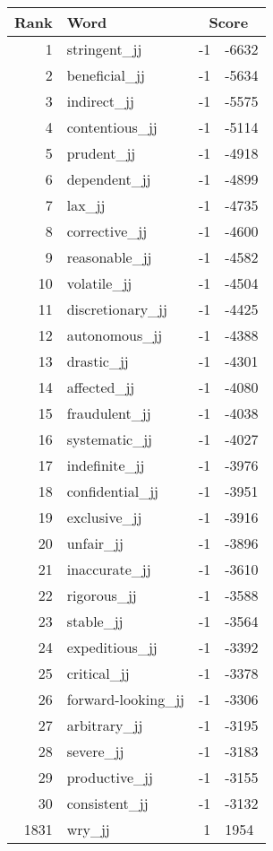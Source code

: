 \begin{longtable}[!htbp]{| rlr@{.}l |}
    \hline
    \textbf{Rank} & \textbf{Word} & \multicolumn{2}{c|}{\textbf{Score}} \\
    \hline
    \endhead
    1 & stringent\_jj & -1 & -6632 \\
    2 & beneficial\_jj & -1 & -5634 \\
    3 & indirect\_jj & -1 & -5575 \\
    4 & contentious\_jj & -1 & -5114 \\
    5 & prudent\_jj & -1 & -4918 \\
    6 & dependent\_jj & -1 & -4899 \\
    7 & lax\_jj & -1 & -4735 \\
    8 & corrective\_jj & -1 & -4600 \\
    9 & reasonable\_jj & -1 & -4582 \\
    10 & volatile\_jj & -1 & -4504 \\
    11 & discretionary\_jj & -1 & -4425 \\
    12 & autonomous\_jj & -1 & -4388 \\
    13 & drastic\_jj & -1 & -4301 \\
    14 & affected\_jj & -1 & -4080 \\
    15 & fraudulent\_jj & -1 & -4038 \\
    16 & systematic\_jj & -1 & -4027 \\
    17 & indefinite\_jj & -1 & -3976 \\
    18 & confidential\_jj & -1 & -3951 \\
    19 & exclusive\_jj & -1 & -3916 \\
    20 & unfair\_jj & -1 & -3896 \\
    21 & inaccurate\_jj & -1 & -3610 \\
    22 & rigorous\_jj & -1 & -3588 \\
    23 & stable\_jj & -1 & -3564 \\
    24 & expeditious\_jj & -1 & -3392 \\
    25 & critical\_jj & -1 & -3378 \\
    26 & forward-looking\_jj & -1 & -3306 \\
    27 & arbitrary\_jj & -1 & -3195 \\
    28 & severe\_jj & -1 & -3183 \\
    29 & productive\_jj & -1 & -3155 \\
    30 & consistent\_jj & -1 & -3132 \\
    1831 & wry\_jj & 1 & 1954 \\

\end{longtable}
